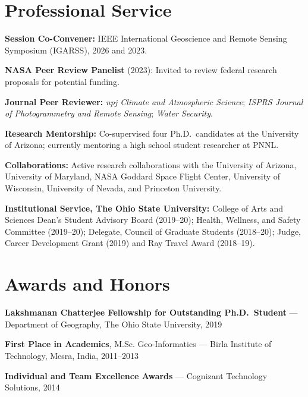\documentclass[10pt,letterpaper]{article}
\begin{document}
\section*{Professional Service}

\begin{entrylist}
  \item \textbf{Session Co-Convener:} IEEE International Geoscience and Remote Sensing Symposium (IGARSS), 2026 and 2023.

  \item \textbf{NASA Peer Review Panelist} (2023): Invited to review federal research proposals for potential funding.

  \item \textbf{Journal Peer Reviewer:} \emph{npj Climate and Atmospheric Science}; \emph{ISPRS Journal of Photogrammetry and Remote Sensing}; \emph{Water Security}.

  \item \textbf{Research Mentorship:} Co-supervised four Ph.D.\ candidates at the University of Arizona; currently mentoring a high school student researcher at PNNL.

  \item \textbf{Collaborations:} Active research collaborations with the University of Arizona, University of Maryland, NASA Goddard Space Flight Center, University of Wisconsin, University of Nevada, and Princeton University.

  \item \textbf{Institutional Service, The Ohio State University:} College of Arts and Sciences Dean's Student Advisory Board (2019--20); Health, Wellness, and Safety Committee (2019--20); Delegate, Council of Graduate Students (2018--20); Judge, Career Development Grant (2019) and Ray Travel Award (2018--19).
\end{entrylist}

\section*{Awards and Honors}

\begin{entrylist}
  \item \textbf{Lakshmanan Chatterjee Fellowship for Outstanding Ph.D.\ Student} --- Department of Geography, The Ohio State University, 2019
  \item \textbf{First Place in Academics}, M.Sc. Geo-Informatics --- Birla Institute of Technology, Mesra, India, 2011--2013
  \item \textbf{Individual and Team Excellence Awards} --- Cognizant Technology Solutions, 2014
\end{entrylist}
\end{document}
